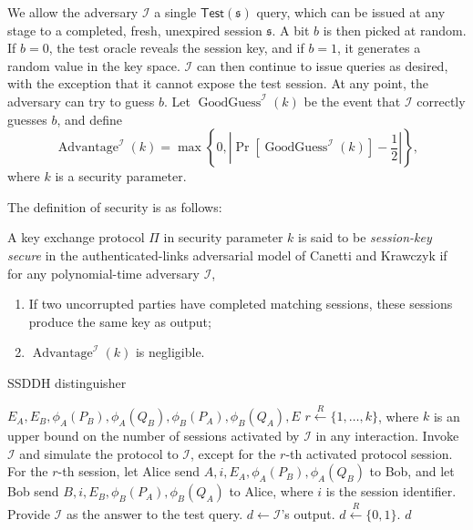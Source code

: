 We allow the adversary $\mathcal{I}$ a single
$\mathsf{Test(\mathfrak{s})}$ query, which can be issued at any stage
to a completed, fresh, unexpired session $\mathfrak{s}$. A bit $b$ is
then picked at random. If $b=0$, the test oracle reveals the session
key, and if $b=1$, it generates a random value in the key
space. $\mathcal{I}$ can then continue to issue queries as desired,
with the exception that it cannot expose the test session. At any
point, the adversary can try to guess $b$. Let
$\operatorname{GoodGuess}^{\mathcal{I}}(k)$ be the event that
$\mathcal{I}$ correctly guesses $b$, and define \[
\operatorname{Advantage}^{\mathcal{I}}(k) = \max \left\{0, \left \vert
\operatorname{Pr}[\operatorname{GoodGuess}^{\mathcal{I}}(k)] - \frac 1
2 \right \vert \right\},\] where $k$ is a security parameter.

The definition of security is as follows:

\begin{definition}\label{def:kep}
A key exchange protocol $\Pi$ in security parameter $k$ is said to be
\emph{session-key secure} in the authenticated-links adversarial model
of Canetti and Krawczyk if for any polynomial-time adversary $\mathcal{I}$,
\begin{enumerate}
\item If two uncorrupted parties have completed matching sessions,
  these sessions produce the same key as output;
\item $\operatorname{Advantage}^{\mathcal{I}}(k)$ is negligible.
\end{enumerate}
\end{definition}

\begin{algorithm}[t]
\caption{SSDDH distinguisher}
\label{alg:distinguisher}
\begin{algorithmic}[1]
\REQUIRE $E_A, E_B, \phi_A(P_B), \phi_A(Q_B), \phi_B(P_A),
\phi_B(Q_A), E$
\STATE $r \stackrel{R}{\leftarrow} \{1,\ldots,k\}$, where $k$ is an
upper bound on the number of sessions activated by $\mathcal{I}$ in any
interaction.
\STATE Invoke $\mathcal{I}$ and simulate the protocol to $\mathcal{I}$, except for the
$r$-th activated protocol session.
\STATE For the $r$-th session, let Alice send $A, i, E_A, \phi_A(P_B),
\phi_A(Q_B)$ to Bob, and let Bob send $B, i, E_B, \phi_B(P_A),
\phi_B(Q_A)$ to Alice, where $i$ is the session identifier.
\STATE Provide $\mathcal{I}$ as the answer to the test query.
\STATE $d \leftarrow \mathcal{I}$'s output.
\ELSE
\STATE $d \stackrel{R}{\leftarrow}\{0,1\}$.
\ENDIF
\ENSURE $d$

\end{algorithmic}
\end{algorithm}

